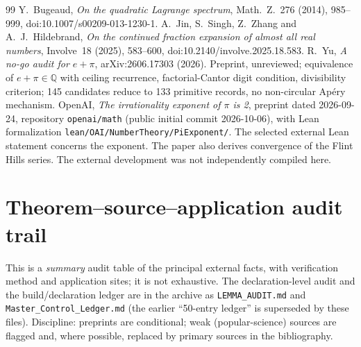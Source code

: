 \documentclass[11pt]{amsart}
\theoremstyle{definition}
\theoremstyle{remark}
\numberwithin{equation}{section}
\newcommand{\Q}{\mathbb{Q}}
\begin{document}
\begin{thebibliography}{99}
 Y.~Bugeaud, \emph{On the quadratic Lagrange spectrum}, Math.~Z.~276 (2014), 985--999, doi:10.1007/s00209-013-1230-1.
 A.~Jin, S.~Singh, Z.~Zhang and A.~J.~Hildebrand, \emph{On the continued fraction expansion of almost all real numbers}, Involve~18 (2025), 583--600, doi:10.2140/involve.2025.18.583.
 R.~Yu, \emph{A no-go audit for $e+\pi$}, arXiv:2606.17303 (2026). Preprint, unreviewed; equivalence of $e+\pi\in\Q$ with ceiling recurrence, factorial-Cantor digit condition, divisibility criterion; 145 candidates reduce to 133 primitive records, no non-circular Ap\'ery mechanism.
 OpenAI, \emph{The irrationality exponent of $\pi$ is 2}, preprint dated 2026-09-24, repository \texttt{openai/math} (public initial commit 2026-10-06), with Lean formalization \texttt{lean/OAI/NumberTheory/PiExponent/}. The selected external Lean statement concerns the exponent. The paper also derives convergence of the Flint Hills series. The external development was not independently compiled here.

\end{thebibliography}

\appendix

\section{Theorem--source--application audit trail}\label{app:audit}

This is a \emph{summary} audit table of the principal external facts, with verification method and application sites; it is not exhaustive. The declaration-level audit and the build/declaration ledger are in the archive as \texttt{LEMMA\_AUDIT.md} and \texttt{Master\_Control\_Ledger.md} (the earlier ``50-entry ledger'' is superseded by these files). Discipline: preprints are conditional; weak (popular-science) sources are flagged and, where possible, replaced by primary sources in the bibliography.
\end{document}

